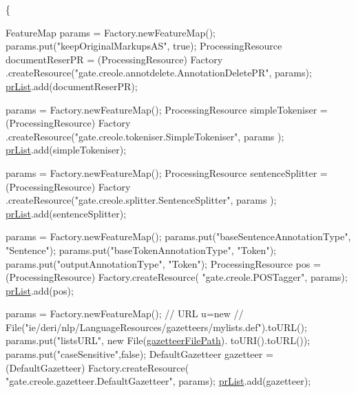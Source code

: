 \begin{DoxyCode}
                                                                         \{

        FeatureMap params = Factory.newFeatureMap();
        params.put(\textcolor{stringliteral}{"keepOriginalMarkupsAS"}, \textcolor{keyword}{true});
        ProcessingResource documentReserPR = (ProcessingResource) Factory
                .createResource(\textcolor{stringliteral}{"gate.creole.annotdelete.AnnotationDeletePR"},
                        params);
        \hyperlink{classcom_1_1poly_1_1nlp_1_1filekommander_1_1gate_1_1_gate_builder_a4e56ddc3afefb48e751266e1e6449b7f}{prList}.add(documentReserPR);

        params = Factory.newFeatureMap();
        ProcessingResource simpleTokeniser = (ProcessingResource) Factory
                .createResource(\textcolor{stringliteral}{"gate.creole.tokeniser.SimpleTokeniser"}, params
      );
        \hyperlink{classcom_1_1poly_1_1nlp_1_1filekommander_1_1gate_1_1_gate_builder_a4e56ddc3afefb48e751266e1e6449b7f}{prList}.add(simpleTokeniser);

        params = Factory.newFeatureMap();
        ProcessingResource sentenceSplitter = (ProcessingResource) Factory
                .createResource(\textcolor{stringliteral}{"gate.creole.splitter.SentenceSplitter"}, params
      );
        \hyperlink{classcom_1_1poly_1_1nlp_1_1filekommander_1_1gate_1_1_gate_builder_a4e56ddc3afefb48e751266e1e6449b7f}{prList}.add(sentenceSplitter);

        params = Factory.newFeatureMap();
        params.put(\textcolor{stringliteral}{"baseSentenceAnnotationType"}, \textcolor{stringliteral}{"Sentence"});
        params.put(\textcolor{stringliteral}{"baseTokenAnnotationType"}, \textcolor{stringliteral}{"Token"});
        params.put(\textcolor{stringliteral}{"outputAnnotationType"}, \textcolor{stringliteral}{"Token"});
        ProcessingResource pos = (ProcessingResource) Factory.createResource(
                \textcolor{stringliteral}{"gate.creole.POSTagger"}, params);
        \hyperlink{classcom_1_1poly_1_1nlp_1_1filekommander_1_1gate_1_1_gate_builder_a4e56ddc3afefb48e751266e1e6449b7f}{prList}.add(pos);

        params = Factory.newFeatureMap();
        \textcolor{comment}{// URL u=new}
        \textcolor{comment}{//
       File("ie/deri/nlp/LanguageResources/gazetteers/mylists.def").toURL();}
        params.put(\textcolor{stringliteral}{"listsURL"}, \textcolor{keyword}{new} File(\hyperlink{classcom_1_1poly_1_1nlp_1_1filekommander_1_1gate_1_1_gate_builder_adceaef80d20a83bd8c1cded83b90a692}{gazetteerFilePath}).
      toURI().toURL());
        params.put(\textcolor{stringliteral}{"caseSensitive"},\textcolor{keyword}{false});
        DefaultGazetteer gazetteer = (DefaultGazetteer) Factory.createResource(
                \textcolor{stringliteral}{"gate.creole.gazetteer.DefaultGazetteer"}, params);
        \hyperlink{classcom_1_1poly_1_1nlp_1_1filekommander_1_1gate_1_1_gate_builder_a4e56ddc3afefb48e751266e1e6449b7f}{prList}.add(gazetteer);


\end{DoxyCode}
